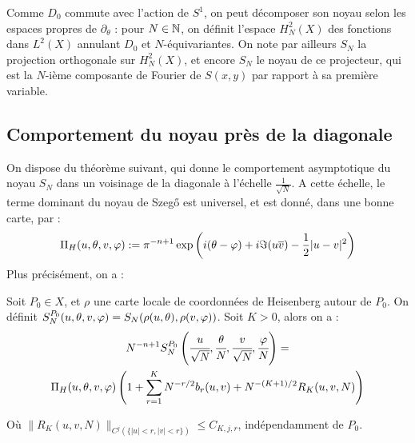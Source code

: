 Comme $D_0$ commute avec l'action de $S^1$, on peut décomposer son noyau selon les espaces propres de $\partial_{\theta}$ : pour $N \in \mathbb{N}$, on définit l'espace $H^2_N(X)$ des fonctions dans $L^2(X)$ annulant $D_0$ et $N$-équivariantes. On note par ailleurs  $S_N$ la projection orthogonale sur $H^2_N(X)$, et encore $S_N$ le noyau de ce projecteur, qui est la $N$-ième composante de Fourier de $S(x,y)$ par rapport à sa première variable.

\subsection{Comportement du noyau près de la diagonale}
On dispose du théorème suivant, qui donne le comportement asymptotique du noyau $S_N$ dans un voisinage de la diagonale à l'échelle $\frac{1}{\sqrt{N}}$. A cette échelle, le terme dominant du noyau de Szeg\H{o} est universel, et est donné, dans une bonne carte, par :
\begin{equation*}
	\Pi_H(u,\theta,v,\varphi) := \pi^{-n+1}\exp\left(i(\theta-\varphi)+i\Im(u\overline{v}) - \frac12 |u-v|^2\right)
\end{equation*}
Plus précisément, on a :
\begin{theorem}\label{thm:SZ}
	Soit $P_0 \in X$, et $\rho$ une carte locale de coordonnées de Heisenberg autour de $P_0$. On définit $S_N^{P_0}(u,\theta,v,\varphi) = S_N(\rho(u,\theta), \rho(v,\varphi))$. Soit $K>0$, alors on a :
	\begin{multline*}
	N^{-n+1}S_N^{P_0}\left(\cfrac{u}{\sqrt{N}},\cfrac{\theta}{N}, \cfrac{v}{\sqrt{N}}, \cfrac{\varphi}{N}\right) = \\\Pi_H(u,\theta,v,\varphi)\left(1+\sum_{r=1}^K N^{-r/2}b_r(u,v) + N^{-(K+1)/2}R_K(u,v,N)\right)
	\end{multline*}
	
	Où $\|R_K(u,v,N)\|_{C^j(\{|u| < r, |v| < r\})} \leq C_{K,j,r}$, indépendamment de $P_0$.
\end{theorem}

